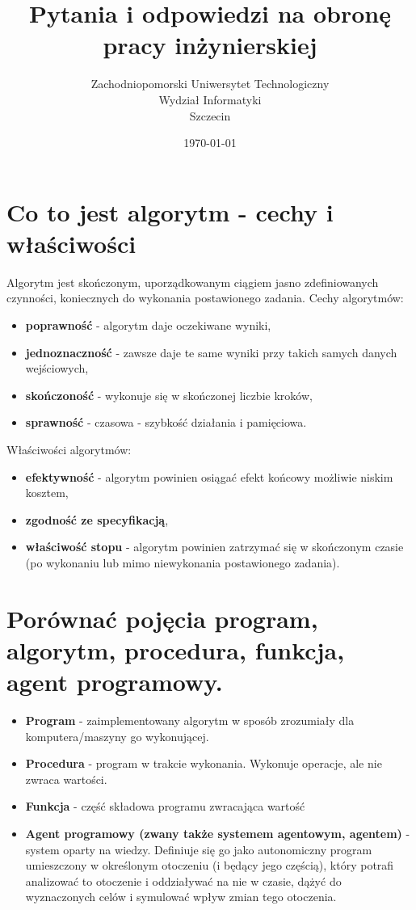 \documentclass[12pt,a4paper]{article}
\title{Pytania i odpowiedzi na obronę pracy inżynierskiej}
\author{
	Zachodniopomorski Uniwersytet Technologiczny\\
	Wydział Informatyki\\
	Szczecin
}
\date{\today}
\begin{document}
	\maketitle

	\section{Co to jest algorytm - cechy i właściwości}
	Algorytm jest skończonym, uporządkowanym ciągiem jasno zdefiniowanych czynności, koniecznych do wykonania postawionego  zadania.
	Cechy algorytmów:
	\begin{itemize}
		\item \textbf{poprawność} - algorytm daje oczekiwane wyniki,
		\item \textbf{jednoznaczność} - zawsze daje te same wyniki przy takich samych danych wejściowych,
		\item \textbf{skończoność} - wykonuje się w skończonej liczbie kroków,
		\item \textbf{sprawność} - czasowa - szybkość działania i pamięciowa.
	\end{itemize}
	Właściwości algorytmów:
	\begin{itemize}
		\item \textbf{efektywność} - algorytm powinien osiągać efekt końcowy możliwie niskim kosztem,
		\item \textbf{zgodność ze specyfikacją},
		\item \textbf{właściwość stopu} - algorytm powinien zatrzymać się w skończonym czasie (po wykonaniu lub mimo niewykonania postawionego zadania).
	\end{itemize}

	\section{Porównać pojęcia program, algorytm, procedura, funkcja, agent programowy.}
	\begin{itemize}
		\item \textbf{Program} - zaimplementowany algorytm w sposób zrozumiały dla komputera/maszyny go wykonującej.
		\item\textbf{Procedura} - program w trakcie wykonania. Wykonuje operacje, ale nie zwraca wartości.
		\item \textbf{Funkcja} - część składowa programu zwracająca wartość
		\item \textbf{Agent programowy (zwany także systemem agentowym, agentem)} - system oparty na wiedzy. Definiuje się go jako autonomiczny program umieszczony w określonym otoczeniu (i będący jego częścią), który potrafi analizować to otoczenie i oddziaływać na nie w czasie, dążyć do wyznaczonych celów i symulować wpływ zmian tego otoczenia.
	\end{itemize}
\end{document}
